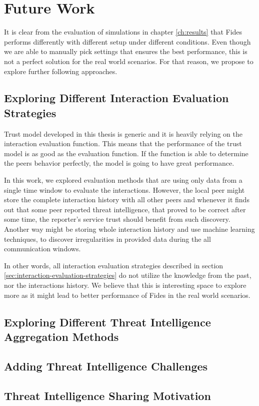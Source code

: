 \section{Future Work}
\label{sec:future-work}
It is clear from the evaluation of simulations in chapter \ref{ch:results} that Fides performs differently with different setup under different conditions.
Even though we are able to manually pick settings that ensures the best performance, this is not a perfect solution for the real world scenarios.
For that reason, we propose to explore further following approaches.

\subsection{Exploring Different Interaction Evaluation Strategies}
Trust model developed in this thesis is generic and it is heavily relying on the interaction evaluation function.
This means that the performance of the trust model is as good as the evaluation function.
If the function is able to determine the peers behavior perfectly, the model is going to have great performance.

In this work, we explored evaluation methods that are using only data from a single time window to evaluate the interactions.
However, the local peer might store the complete interaction history with all other peers and whenever it finds out that some peer reported threat intelligence, that proved to be correct after some time, the reporter's service trust should benefit from such discovery.
Another way might be storing whole interaction history and use machine learning techniques, to discover irregularities in provided data during the all communication windows.

In other words, all interaction evaluation strategies described in section \ref{sec:interaction-evaluation-strategies} do not utilize the knowledge from the past, nor the interactions history.
We believe that this is interesting space to explore more as it might lead to better performance of Fides in the real world scenarios.

\subsection{Exploring Different Threat Intelligence Aggregation Methods}

\subsection{Adding Threat Intelligence Challenges}

\subsection{Threat Intelligence Sharing Motivation}
